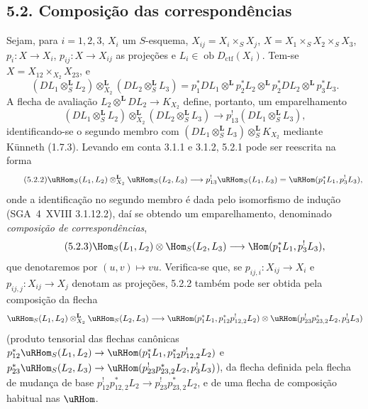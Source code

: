 \subsection*{5.2. Composição das correspondências}

Sejam, para $i=1,2,3$, $X_i$ um $S$-esquema, $X_{ij}=X_i\times_SX_j$, $X=X_1\times_SX_2\times_SX_3$, $p_i:X\to X_i$, $p_{ij}:X\to X_{ij}$ as projeções e $L_i\in\operatorname{ob}D_{\mathrm{ctf}}(X_i)$. Tem-se $X=X_{12}\times_{X_2}X_{23}$, e
\[
(DL_1\otimes_S^{\mathbf L}L_2)\otimes_{X_2}^{\mathbf L}(DL_2\otimes_S^{\mathbf L}L_3)
=p_1^*DL_1\otimes^{\mathbf L}p_2^*L_2\otimes^{\mathbf L}p_2^*DL_2\otimes^{\mathbf L}p_3^*L_3.
\]
A flecha de avaliação $L_2\otimes^{\mathbf L}DL_2\to K_{X_2}$ define, portanto, um emparelhamento
\begin{equation}
\tag{5.2.1}
(DL_1\otimes_S^{\mathbf L}L_2)\otimes_{X_2}^{\mathbf L}(DL_2\otimes_S^{\mathbf L}L_3)\longrightarrow p_{13}^!(DL_1\otimes_S^{\mathbf L}L_3),
\end{equation}
identificando-se o segundo membro com $(DL_1\otimes_S^{\mathbf L}L_3)\otimes_S^{\mathbf L}K_{X_2}$ mediante Künneth (1.7.3). Levando em conta 3.1.1 e 3.1.2, 5.2.1 pode ser reescrita na forma
\begin{equation}
\tag{5.2.2}
\uRHom_S(L_1,L_2)\otimes_{X_2}^{\mathbf L}\uRHom_S(L_2,L_3)\longrightarrow p_{13}^!\uRHom_S(L_1,L_3)=\uRHom(p_1^*L_1,p_3^!L_3),
\end{equation}
onde a identificação no segundo membro é dada pelo isomorfismo de indução (SGA~4~XVIII 3.1.12.2), daí se obtendo um emparelhamento, denominado \emph{composição de correspondências},
\begin{equation}
\tag{5.2.3}
\Hom_S(L_1,L_2)\otimes\Hom_S(L_2,L_3)\longrightarrow\Hom(p_1^*L_1,p_3^!L_3),
\end{equation}
que denotaremos por $(u,v)\mapsto vu$. Verifica-se que, se $p_{ij,i}:X_{ij}\to X_i$ e $p_{ij,j}:X_{ij}\to X_j$ denotam as projeções, 5.2.2 também pode ser obtida pela composição da flecha
\[
\uRHom_S(L_1,L_2)\otimes_{X_2}^{\mathbf L}\uRHom_S(L_2,L_3)
\longrightarrow
\uRHom(p_1^*L_1,p_{12}^*p_{12,2}^!L_2)
\otimes
\uRHom(p_{23}^!p_{23,2}^*L_2,p_3^!L_3)
\]
(produto tensorial das flechas canônicas $p_{12}^*\uRHom_S(L_1,L_2)\to\uRHom(p_1^*L_1,p_{12}^*p_{12,2}^!L_2)$ e $p_{23}^*\uRHom_S(L_2,L_3)\to\uRHom(p_{23}^!p_{23,2}^*L_2,p_3^!L_3)$), da flecha definida pela flecha de mudança de base $p_{12}^!p_{12,2}^*L_2\to p_{23}^!p_{23,2}^*L_2$, e de uma flecha de composição habitual nas $\uRHom$.

